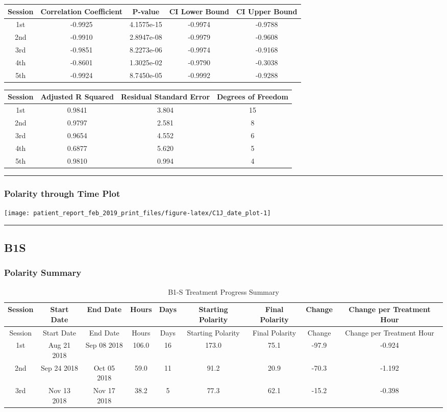 \documentclass[]{article}
\begin{document}
\begin{longtable}[]{@{}ccccc@{}}
\toprule
Session & Correlation Coefficient & P-value & CI Lower Bound & CI Upper
Bound\tabularnewline
\midrule
\endhead
1st & -0.9925 & 4.1575e-15 & -0.9974 & -0.9788\tabularnewline
2nd & -0.9910 & 2.8947e-08 & -0.9979 & -0.9608\tabularnewline
3rd & -0.9851 & 8.2273e-06 & -0.9974 & -0.9168\tabularnewline
4th & -0.8601 & 1.3025e-02 & -0.9790 & -0.3038\tabularnewline
5th & -0.9924 & 8.7450e-05 & -0.9992 & -0.9288\tabularnewline
\bottomrule
\end{longtable}

\begin{longtable}[]{@{}cccc@{}}
\toprule
Session & Adjusted R Squared & Residual Standard Error & Degrees of
Freedom\tabularnewline
\midrule
\endhead
1st & 0.9841 & 3.804 & 15\tabularnewline
2nd & 0.9797 & 2.581 & 8\tabularnewline
3rd & 0.9654 & 4.552 & 6\tabularnewline
4th & 0.6877 & 5.620 & 5\tabularnewline
5th & 0.9810 & 0.994 & 4\tabularnewline
\bottomrule
\end{longtable}

\begin{center}\rule{0.5\linewidth}{\linethickness}\end{center}

\subsubsection{Polarity through Time
Plot}\label{polarity-through-time-plot}

\texttt{[image: patient\_report\_feb\_2019\_print\_files/figure-latex/C1J\_date\_plot-1]}

\begin{center}\rule{0.5\linewidth}{\linethickness}\end{center}

\subsection{B1S}\label{b1s}

\subsubsection{Polarity Summary}\label{polarity-summary-1}

\begin{longtable}[]{@{}ccccccccc@{}}
\caption{B1-S Treatment Progress Summary}\tabularnewline
\toprule
Session & Start Date & End Date & Hours & Days & Starting Polarity &
Final Polarity & Change & Change per Treatment Hour\tabularnewline
\midrule
\endfirsthead
\toprule
Session & Start Date & End Date & Hours & Days & Starting Polarity &
Final Polarity & Change & Change per Treatment Hour\tabularnewline
\midrule
\endhead
1st & Aug 21 2018 & Sep 08 2018 & 106.0 & 16 & 173.0 & 75.1 & -97.9 &
-0.924\tabularnewline
2nd & Sep 24 2018 & Oct 05 2018 & 59.0 & 11 & 91.2 & 20.9 & -70.3 &
-1.192\tabularnewline
3rd & Nov 13 2018 & Nov 17 2018 & 38.2 & 5 & 77.3 & 62.1 & -15.2 &
-0.398\tabularnewline
\bottomrule
\end{longtable}
\end{document}
